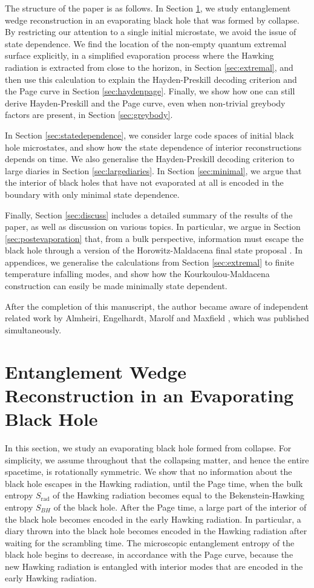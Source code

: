 \documentclass[11pt,a4paper]{article}
\newcommand{\Srad}{S_\text{rad} }
\begin{document}
The structure of the paper is as follows. In Section \ref{sec:evaporation}, we study entanglement wedge reconstruction in an evaporating black hole that was formed by collapse. By restricting our attention to a single initial microstate, we avoid the issue of state dependence. We find the location of the non-empty quantum extremal surface explicitly, in a simplified evaporation process where the Hawking radiation is extracted from close to the horizon, in Section \ref{sec:extremal}, and then use this calculation to explain the Hayden-Preskill decoding criterion and the Page curve in Section \ref{sec:haydenpage}. Finally, we show how one can still derive Hayden-Preskill and the Page curve, even when non-trivial greybody factors are present, in Section \ref{sec:greybody}.

In Section \ref{sec:statedependence}, we consider large code spaces of initial black hole microstates, and show how the state dependence of interior reconstructions depends on time. We also generalise the Hayden-Preskill decoding criterion to large diaries in Section \ref{sec:largediaries}. In Section \ref{sec:minimal}, we argue that the interior of black holes that have not evaporated at all is encoded in the boundary with only minimal state dependence.

Finally, Section \ref{sec:discuss} includes a detailed summary of the results of the paper, as well as discussion on various topics. In particular, we argue in Section \ref{sec:postevaporation} that, from a bulk perspective, information must escape the black hole through a version of the Horowitz-Maldacena final state proposal \cite{horowitz2004black}. In appendices, we generalise the calculations from Section \ref{sec:extremal} to finite temperature infalling modes, and show how the Kourkoulou-Maldacena construction can easily be made minimally state dependent.

After the completion of this manuscript, the author became aware of independent related work by Almheiri, Engelhardt, Marolf and Maxfield \cite{almheiri2019entropy}, which was published simultaneously.

\section{Entanglement Wedge Reconstruction in an Evaporating Black Hole} \label{sec:evaporation}
In this section, we study an evaporating black hole formed from collapse. For simplicity, we assume throughout that the collapsing matter, and hence the entire spacetime, is rotationally symmetric. We show that no information about the black hole escapes in the Hawking radiation, until the Page time, when the bulk entropy $\Srad$ of the Hawking radiation becomes equal to the Bekenstein-Hawking entropy $S_{BH}$ of the black hole. After the Page time, a large part of the interior of the black hole becomes encoded in the early Hawking radiation. In particular, a diary thrown into the black hole becomes encoded in the Hawking radiation after waiting for the scrambling time. The microscopic entanglement entropy of the black hole begins to decrease, in accordance with the Page curve, because the new Hawking radiation is entangled with interior modes that are encoded in the early Hawking radiation.
\end{document}
